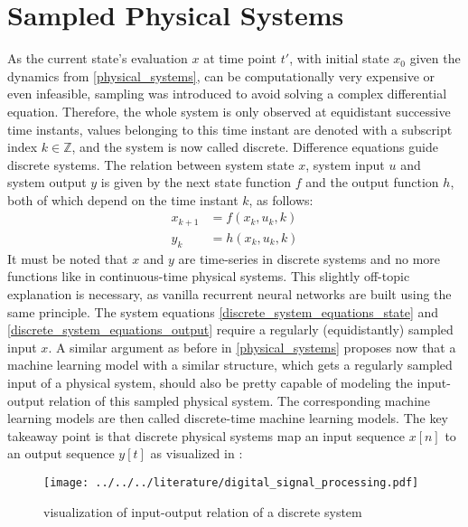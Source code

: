 \documentclass[draft,final]{vutinfth} %
\begin{document}
    \section{Sampled Physical Systems} \label{sampled_physical_systems}
    As the current state's evaluation $x$ at time point $t'$, with initial state $x_0$ given the dynamics from \ref{physical_systems}, can be computationally very expensive or even infeasible, sampling was introduced to avoid solving a complex differential equation.
    Therefore, the whole system is only observed at equidistant successive time instants, values belonging to this time instant are denoted with a subscript index $k \in \mathbb{Z}$, and the system is now called discrete.
    Difference equations guide discrete systems. The relation between system state $x$, system input $u$ and system output $y$ is given by the next state function $f$ and the output function $h$, both of which depend on the time instant $k$, as follows:
    \begin{align} 
        \label{discrete_system_equations_state}
        x_{k+1} &= f(x_k,u_k,k) \\
        \label{discrete_system_equations_output}
        y_k &= h(x_k,u_k,k)
    \end{align} 
    It must be noted that $x$ and $y$ are time-series in discrete systems and no more functions like in continuous-time physical systems.
    This slightly off-topic explanation is necessary, as vanilla recurrent neural networks are built using the same principle. 
    The system equations \ref{discrete_system_equations_state} and \ref{discrete_system_equations_output} require a regularly (equidistantly) sampled input $x$.
    A similar argument as before in \ref{physical_systems} proposes now that a machine learning model with a similar structure, which gets a regularly sampled input of a physical system, should also be pretty capable of modeling the input-output relation of this sampled physical system.
    The corresponding machine learning models are then called discrete-time machine learning models.
    The key takeaway point is that discrete physical systems map an input sequence $x[n]$ to an output sequence $y[t]$ as visualized in \cite[p. 102]{dsp}:
    \begin{figure}[H]
        \centering{}
        \texttt{[image: ../../../literature/digital\_signal\_processing.pdf]}
        \caption{visualization of input-output relation of a discrete system}
        \label{fig:discrete_system_vis}
    \end{figure}
    
\end{document}

